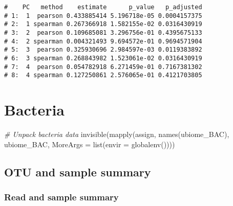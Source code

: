 \documentclass[
]{article}
\newenvironment{Shaded}{\begin{snugshade}}{\end{snugshade}}
\newcommand{\AttributeTok}[1]{\textcolor[rgb]{0.77,0.63,0.00}{#1}}
\newcommand{\CommentTok}[1]{\textcolor[rgb]{0.56,0.35,0.01}{\textit{#1}}}
\newcommand{\FunctionTok}[1]{\textcolor[rgb]{0.00,0.00,0.00}{#1}}
\newcommand{\NormalTok}[1]{#1}
\begin{document}
\begin{verbatim}
#    PC   method    estimate      p_value   p_adjusted
# 1:  1  pearson 0.433885414 5.196718e-05 0.0004157375
# 2:  1 spearman 0.267366918 1.582155e-02 0.0316430919
# 3:  2  pearson 0.109685081 3.296756e-01 0.4395675133
# 4:  2 spearman 0.004321493 9.694572e-01 0.9694571904
# 5:  3  pearson 0.325930696 2.984597e-03 0.0119383892
# 6:  3 spearman 0.268843982 1.523061e-02 0.0316430919
# 7:  4  pearson 0.054782918 6.271459e-01 0.7167381302
# 8:  4 spearman 0.127250861 2.576065e-01 0.4121703805
\end{verbatim}

\hypertarget{bacteria}{%
\section{\texorpdfstring{\textbf{Bacteria}}{Bacteria}}\label{bacteria}}

\begin{Shaded}
\begin{Highlighting}[]
\CommentTok{\# Unpack bacteria data}
\FunctionTok{invisible}\NormalTok{(}\FunctionTok{mapply}\NormalTok{(assign, }\FunctionTok{names}\NormalTok{(ubiome\_BAC), ubiome\_BAC, }\AttributeTok{MoreArgs =} \FunctionTok{list}\NormalTok{(}\AttributeTok{envir =} \FunctionTok{globalenv}\NormalTok{())))}
\end{Highlighting}
\end{Shaded}

\hypertarget{otu-and-sample-summary-1}{%
\subsection{OTU and sample summary}\label{otu-and-sample-summary-1}}

\hypertarget{read-and-sample-summary-1}{%
\subsubsection{Read and sample
summary}\label{read-and-sample-summary-1}}
\end{document}
